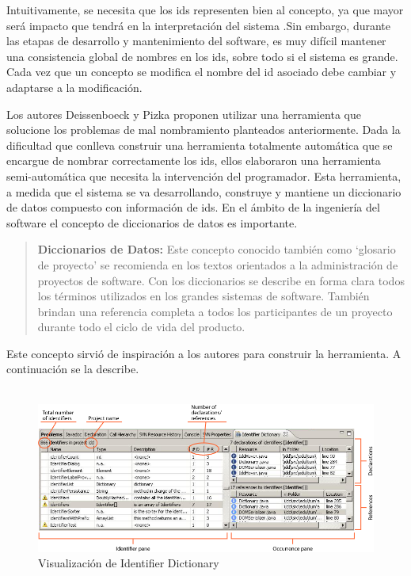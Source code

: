 \documentclass[a4paper,12pt]{report}
\begin{document}
Intuitivamente, se necesita que los ids representen bien al concepto, ya que mayor será impacto que tendrá en la interpretación del sistema \cite{DFPM05,DLHD06}.Sin embargo, durante las etapas de desarrollo y mantenimiento del software, es muy difícil mantener una consistencia global de nombres en los ids, sobre todo si el sistema es grande. Cada vez que un concepto se modifica el nombre del id asociado debe cambiar y adaptarse a la modificación.

Los autores Deissenboeck y Pizka \cite{DFPM05} proponen utilizar una herramienta que solucione los problemas de mal nombramiento planteados anteriormente. Dada la dificultad que conlleva construir una herramienta totalmente automática que se encargue de nombrar correctamente los ids, ellos elaboraron una herramienta semi-automática que necesita la intervención del programador. Esta herramienta, a medida que el sistema se va desarrollando, construye y mantiene un diccionario de datos compuesto con información de ids. En el ámbito de la ingeniería del software el concepto de diccionarios de datos es importante.


\begin{verse}
\textbf{Diccionarios de Datos:} Este concepto conocido también como `glosario de proyecto' se recomienda en los textos orientados a la administración de proyectos de software. Con los diccionarios se describe en forma clara todos los términos utilizados en los grandes sistemas de software. También brindan una referencia completa a todos los participantes de un proyecto durante todo el ciclo de vida del producto.
\end{verse}

Este concepto sirvió de inspiración a los autores para construir la herramienta. A continuación se la describe. \\ \\

\begin{figure}[h] %
\centerline{%
\includegraphics[scale= 0.55]{./idd_2.png}
}
\caption{Visualización de Identifier Dictionary}
\label{captura3}
\end{figure}
\pagebreak
\end{document}
